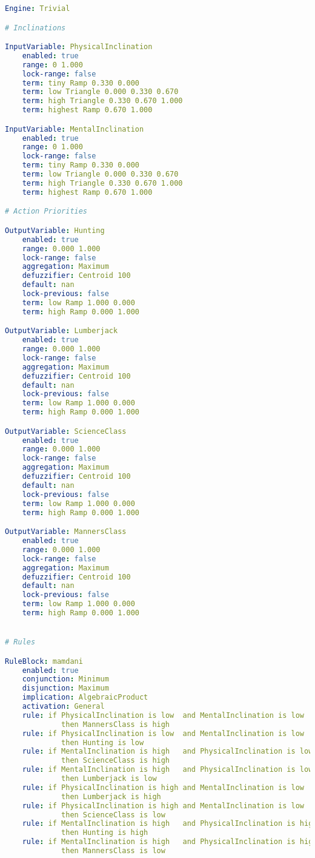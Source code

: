 \documentclass[12pt, a4paper]{report}
\begin{document}
	\begin{lstlisting}[language=yaml]
Engine: Trivial

# Inclinations

InputVariable: PhysicalInclination
	enabled: true
	range: 0 1.000
	lock-range: false
	term: tiny Ramp 0.330 0.000 
	term: low Triangle 0.000 0.330 0.670
	term: high Triangle 0.330 0.670 1.000
	term: highest Ramp 0.670 1.000

InputVariable: MentalInclination
	enabled: true
	range: 0 1.000
	lock-range: false
	term: tiny Ramp 0.330 0.000 
	term: low Triangle 0.000 0.330 0.670
	term: high Triangle 0.330 0.670 1.000
	term: highest Ramp 0.670 1.000

# Action Priorities

OutputVariable: Hunting
	enabled: true
	range: 0.000 1.000
	lock-range: false
	aggregation: Maximum
	defuzzifier: Centroid 100
	default: nan
	lock-previous: false
	term: low Ramp 1.000 0.000
	term: high Ramp 0.000 1.000

OutputVariable: Lumberjack
	enabled: true
	range: 0.000 1.000
	lock-range: false
	aggregation: Maximum
	defuzzifier: Centroid 100
	default: nan
	lock-previous: false
	term: low Ramp 1.000 0.000
	term: high Ramp 0.000 1.000

OutputVariable: ScienceClass
	enabled: true
	range: 0.000 1.000
	lock-range: false
	aggregation: Maximum
	defuzzifier: Centroid 100
	default: nan
	lock-previous: false
	term: low Ramp 1.000 0.000
	term: high Ramp 0.000 1.000

OutputVariable: MannersClass
	enabled: true
	range: 0.000 1.000
	lock-range: false
	aggregation: Maximum
	defuzzifier: Centroid 100
	default: nan
	lock-previous: false
	term: low Ramp 1.000 0.000
	term: high Ramp 0.000 1.000


# Rules

RuleBlock: mamdani
	enabled: true
	conjunction: Minimum
	disjunction: Maximum
	implication: AlgebraicProduct
	activation: General
	rule: if PhysicalInclination is low  and MentalInclination is low
		     then MannersClass is high
	rule: if PhysicalInclination is low  and MentalInclination is low    
			 then Hunting is low
	rule: if MentalInclination is high   and PhysicalInclination is low  
			 then ScienceClass is high
	rule: if MentalInclination is high   and PhysicalInclination is low  
			 then Lumberjack is low
	rule: if PhysicalInclination is high and MentalInclination is low    
			 then Lumberjack is high
	rule: if PhysicalInclination is high and MentalInclination is low    
			 then ScienceClass is low
	rule: if MentalInclination is high   and PhysicalInclination is high 
			 then Hunting is high
	rule: if MentalInclination is high   and PhysicalInclination is high 
		     then MannersClass is low
	\end{lstlisting}
	
\end{document}
